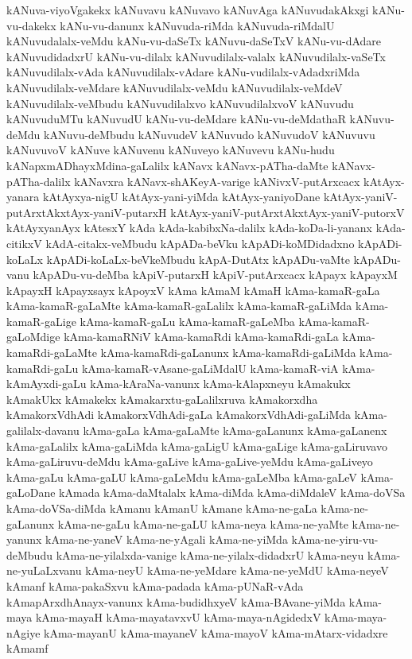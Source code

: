 {kANuva-viyoVgakekx
kANuvavu
kANuvavo
kANuvAga
kANuvudakAkxgi
kANu-vu-dakekx
kANu-vu-danunx
kANuvuda-riMda
kANuvuda-riMdalU
kANuvudalalx-veMdu
kANu-vu-daSeTx
kANuvu-daSeTxV
kANu-vu-dAdare
kANuvudidadxrU
kANu-vu-dilalx
kANuvudilalx-valalx
kANuvudilalx-vaSeTx
kANuvudilalx-vAda
kANuvudilalx-vAdare
kANu-vudilalx-vAdadxriMda
kANuvudilalx-veMdare
kANuvudilalx-veMdu
kANuvudilalx-veMdeV
kANuvudilalx-veMbudu
kANuvudilalxvo
kANuvudilalxvoV
kANuvudu
kANuvuduMTu
kANuvudU
kANu-vu-deMdare
kANu-vu-deMdathaR
kANuvu-deMdu
kANuvu-deMbudu
kANuvudeV
kANuvudo
kANuvudoV
kANuvuvu
kANuvuvoV
kANuve
kANuvenu
kANuveyo
kANuvevu
kANu-hudu
kANapxmADhayxMdina-gaLalilx
kANavx
kANavx-pATha-daMte
kANavx-pATha-dalilx
kANavxra
kANavx-shAKeyA-varige
kANivxV-putArxcacx
kAtAyx-yanara
kAtAyxya-nigU
kAtAyx-yani-yiMda
kAtAyx-yaniyoDane
kAtAyx-yaniV-putArxtAkxtAyx-yaniV-putarxH
kAtAyx-yaniV-putArxtAkxtAyx-yaniV-putorxV
kAtAyxyanAyx
kAtesxY
kAda
kAda-kabibxNa-dalilx
kAda-koDa-li-yananx
kAda-citikxV
kAdA-citakx-veMbudu
kApADa-beVku
kApADi-koMDidadxno
kApADi-koLaLx
kApADi-koLaLx-beVkeMbudu
kApA-DutAtx
kApADu-vaMte
kApADu-vanu
kApADu-vu-deMba
kApiV-putarxH
kApiV-putArxcacx
kApayx
kApayxM
kApayxH
kApayxsayx
kApoyxV
kAma
kAmaM
kAmaH
kAma-kamaR-gaLa
kAma-kamaR-gaLaMte
kAma-kamaR-gaLalilx
kAma-kamaR-gaLiMda
kAma-kamaR-gaLige
kAma-kamaR-gaLu
kAma-kamaR-gaLeMba
kAma-kamaR-gaLoMdige
kAma-kamaRNiV
kAma-kamaRdi
kAma-kamaRdi-gaLa
kAma-kamaRdi-gaLaMte
kAma-kamaRdi-gaLanunx
kAma-kamaRdi-gaLiMda
kAma-kamaRdi-gaLu
kAma-kamaR-vAsane-gaLiMdalU
kAma-kamaR-viA
kAma-kAmAyxdi-gaLu
kAma-kAraNa-vanunx
kAma-kAlapxneyu
kAmakukx
kAmakUkx
kAmakekx
kAmakarxtu-gaLalilxruva
kAmakorxdha
kAmakorxVdhAdi
kAmakorxVdhAdi-gaLa
kAmakorxVdhAdi-gaLiMda
kAma-galilalx-davanu
kAma-gaLa
kAma-gaLaMte
kAma-gaLanunx
kAma-gaLanenx
kAma-gaLalilx
kAma-gaLiMda
kAma-gaLigU
kAma-gaLige
kAma-gaLiruvavo
kAma-gaLiruvu-deMdu
kAma-gaLive
kAma-gaLive-yeMdu
kAma-gaLiveyo
kAma-gaLu
kAma-gaLU
kAma-gaLeMdu
kAma-gaLeMba
kAma-gaLeV
kAma-gaLoDane
kAmada
kAma-daMtalalx
kAma-diMda
kAma-diMdaleV
kAma-doVSa
kAma-doVSa-diMda
kAmanu
kAmanU
kAmane
kAma-ne-gaLa
kAma-ne-gaLanunx
kAma-ne-gaLu
kAma-ne-gaLU
kAma-neya
kAma-ne-yaMte
kAma-ne-yanunx
kAma-ne-yaneV
kAma-ne-yAgali
kAma-ne-yiMda
kAma-ne-yiru-vu-deMbudu
kAma-ne-yilalxda-vanige
kAma-ne-yilalx-didadxrU
kAma-neyu
kAma-ne-yuLaLxvanu
kAma-neyU
kAma-ne-yeMdare
kAma-ne-yeMdU
kAma-neyeV
kAmanf
kAma-pakaSxvu
kAma-padada
kAma-pUNaR-vAda
kAmapArxdhAnayx-vanunx
kAma-budidhxyeV
kAma-BAvane-yiMda
kAma-maya
kAma-mayaH
kAma-mayatavxvU
kAma-maya-nAgidedxV
kAma-maya-nAgiye
kAma-mayanU
kAma-mayaneV
kAma-mayoV
kAma-mAtarx-vidadxre
kAmamf
}
